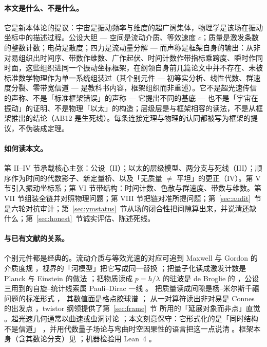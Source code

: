 \documentclass[aps,prd,preprint,superscriptaddress,amsmath,amssymb]{revtex4-2}
\begin{document}
\paragraph{本文是什么、不是什么。}
它是新本体论的提议：宇宙是振动频率与维度的超广阔集体，物理学是该场在振动坐标中的描述过程。公设大胆 --- 空间是流动介质、等效速度 $c$；质量是激发条数的整数计数；电荷是散度；四力是流动量分解 --- 而声称是框架自身的输出：从非对易组织出时间序、带数作维数、广作起伏、时间计数作带指标乘跨度、瞬时作同时面，这些组织进同一个振动坐标框架，在纲领自身前几篇论文中并不存在、未被标准数学物理作为单一系统组装过（其个别元件 --- 初等实分析、线性代数、群速度分裂、零带宽信道 --- 是教科书内容，框架组织而非重述）。它不是超光速传信的声称、不是「标准框架错误」的声称 --- 它提出不同的基底 --- 也不是「宇宙在振动」的证明、不是物理「以太」的构造；层级层是与框架相容的读法，不是从框架推出的结论（AB12 是生死线）。每条连接定理与物理的认同都被写为框架的提议，不伪装成定理。

\paragraph{如何读本文。}
第 II--IV 节承载核心主张：公设（II）；以太的层级模型、两分支与死线（III）；顺序作为时间的代数影子、新定量桥、以及「无质量 $\ne$ 平坦」的更正（IV）。第 V 节引入振动坐标系；第 VI 节带结构：时间计数、色散与群速度、带数与维数。第 VII 节组装全链并对照物理问题；第 VIII 节把链对准所提问题；第~\ref{sec:audit}~节是六轮对抗审计；第~\ref{sec:ymstatus}~节从场的闭合性把间隙算出来，并说清还缺什么；第~\ref{sec:honest}~节诚实评估、陈述死线。

\paragraph{与已有文献的关系。}
个别元件都是经典的。流动介质与等效光速的对应可追到 Maxwell 与 Gordon 的介质度规
\cite{maxwell1996dynamical,gordon1923lichtfortpflanzung}，视界的「河模型」把它写成同一替换
\cite{hamilton2008river}；把量子化读成激发计数是 Planck 与 Einstein 的做法
\cite{planck1978gesetz,einstein1905erzeugung,einstein1915feldgleichungen}；把物质读成
$p=h/\lambda$ 的驻波是 de Broglie 的 \cite{de1924recherches}，公设三用到的自旋–统计线索属
Pauli–Dirac 一线 \cite{pauli1925zusammenhang,dirac1928quantum,heisenberg1927anschaulichen}。
把质量读成间隙是杨–米尔斯千禧问题的标准形式 \cite{yang1954conservation,jaffe2000yang}，
其数值面是格点胶球谱 \cite{morningstar1999glueball,chen2006glueball,besiii2026lightest}；
从一对算符读出非对易是 Connes 的出发点 \cite{connes1994ncg}，twistor 纲领提供了第~\ref{sec:frame}~节
所用的「延展对象而非点」直觉 \cite{penrose1967twistor}。超光速几何通常以曲速或虫洞讨论
\cite{alcubierre1994warp,morris1988wormholes}；本文刻意保守：它形式化的是「同时结构不是信道」
\cite{bell1964einstein,aspect1982experimental}，并用代数量子场论与弯曲时空因果性的语言把这一点说清
\cite{weinberg1995quantum,wald1994quantum}。框架本身（含其数论分支）见
\cite{liu2026cosmic,liu2026yangmills,ProjectionPhysics}；机器检验用 Lean~4 \cite{de2015lean}。
\end{document}
